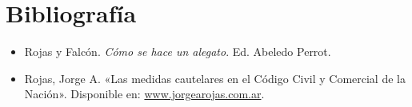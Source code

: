 \documentclass[12pt,oneside]{book}
\begin{document}
\chapter*{Bibliografía}
\begin{itemize}
    \item Rojas y Falcón. \textit{Cómo se hace un alegato}. Ed. Abeledo Perrot.
    \item Rojas, Jorge A. «Las medidas cautelares en el Código Civil y Comercial de la Nación». Disponible en: \url{www.jorgearojas.com.ar}.
\end{itemize}
\end{document}

